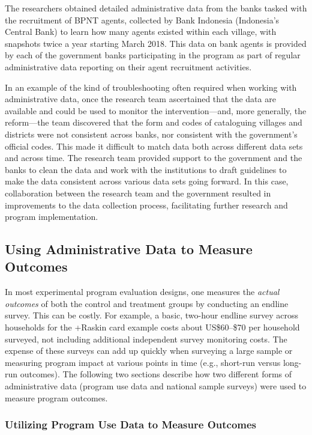 \documentclass[
]{WileySix}
\begin{document}
The researchers obtained detailed administrative data from the banks tasked with the recruitment of BPNT agents, collected by Bank Indonesia (Indonesia's Central Bank) to learn how many agents existed within each village, with snapshots twice a year starting March 2018. This data on bank agents is provided by each of the government banks participating in the program as part of regular administrative data reporting on their agent recruitment activities.

In an example of the kind of troubleshooting often required when working with administrative data, once the research team ascertained that the data are available and could be used to monitor the intervention---and, more generally, the reform---the team discovered that the form and codes of cataloguing villages and districts were not consistent across banks, nor consistent with the government's official codes. This made it difficult to match data both across different data sets and across time. The research team provided support to the government and the banks to clean the data and work with the institutions to draft guidelines to make the data consistent across various data sets going forward. In this case, collaboration between the research team and the government resulted in improvements to the data collection process, facilitating further research and program implementation.

\hypertarget{using-administrative-data-to-measure-outcomes}{%
\subsection{Using Administrative Data to Measure Outcomes}\label{using-administrative-data-to-measure-outcomes}}

In most experimental program evaluation designs, one measures the \emph{actual outcomes} of both the control and treatment groups by conducting an endline survey. This can be costly. For example, a basic, two-hour endline survey across households for the +Raskin\textbar{} card example costs about US\$60--\$70 per household surveyed, not including additional independent survey monitoring costs. The expense of these surveys can add up quickly when surveying a large sample or measuring program impact at various points in time (e.g., short-run versus long-run outcomes). The following two sections describe how two different forms of administrative data (program use data and national sample surveys) were used to measure program outcomes.

\hypertarget{utilizing-program-use-data-to-measure-outcomes}{%
\subsubsection{Utilizing Program Use Data to Measure Outcomes}\label{utilizing-program-use-data-to-measure-outcomes}}
\end{document}
